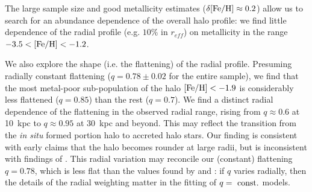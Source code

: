 \documentclass[12pt,preprint]{aastex}
\newcommand{\feh}{{\rm [Fe/H]}}
\begin{document}
The large sample size and good metallicity estimates ($\delta\feh \approx 0.2$) allow us to 
search for an abundance dependence of the overall halo profile: we find little dependence of the radial profile (e.g. $10\%$ in $r_{eff}$) on metallicity in the range
$\rm -3.5<\feh<-1.2$. 

We also explore the shape (i.e. the flattening) of the radial profile. Presuming radially constant flattening ($q=0.78\pm 0.02$ for the entire sample), we find that the most metal-poor sub-population of the halo $\feh<-1.9$ is considerably less flattened ($q=0.85$) than the rest ($q=0.7$).
We find a distinct radial dependence of the flattening in the observed radial 
range, rising from $q\approx 0.6$ at 10~kpc to $q\approx 0.95$ at 30~kpc and beyond. 
This may reflect the transition from  the \textit{in situ} formed portion halo to accreted halo stars.
Our finding is consistent with early claims \citet{Preston1991} that the halo becomes rounder 
at large radii, but is inconsistent with findings of \citet{Sluis1998, Sesar2011,Deason2011}.
This radial variation may reconcile our (constant) flattening $q=0.78$,
which is less flat than the values found by \citet[;q=0.7]{Sesar2011} 
and \citet[;q=0.58]{Deason2011} : if $q$ varies radially, then the details of the radial weighting matter in the fitting of $q=~\rm const.$ models.
\end{document}
